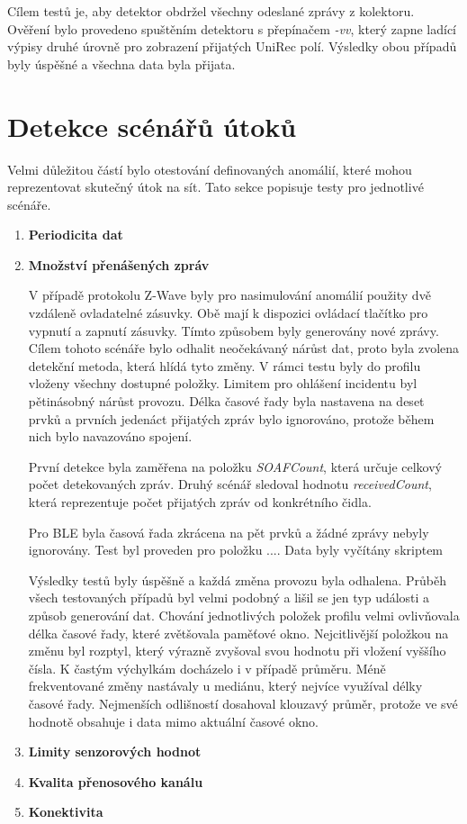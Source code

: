 Cílem testů je, aby detektor obdržel všechny odeslané zprávy z kolektoru. Ověření bylo provedeno
spuštěním detektoru s přepínačem \textit{-vv}, který zapne ladící výpisy druhé úrovně pro zobrazení 
přijatých UniRec polí. Výsledky obou případů byly úspěšné a všechna data byla přijata.

\section{Detekce scénářů útoků}
Velmi důležitou částí bylo otestování definovaných anomálií, které mohou reprezentovat skutečný
útok na sít. Tato sekce popisuje testy pro jednotlivé scénáře.

  \begin{enumerate}
    \item \textbf{Periodicita dat}
    \item \textbf{Množství přenášených zpráv}
    
    V případě protokolu Z-Wave byly pro nasimulování anomálií použity dvě vzdáleně ovladatelné
    zásuvky. Obě mají k dispozici ovládací tlačítko pro vypnutí a zapnutí zásuvky. Tímto způsobem
    byly generovány nové zprávy. Cílem tohoto scénáře bylo odhalit neočekávaný nárůst dat, proto
    byla zvolena detekční metoda, která hlídá tyto změny. V rámci testu byly do profilu 
    vloženy všechny dostupné položky. Limitem pro ohlášení incidentu byl pětinásobný nárůst
    provozu. Délka časové řady byla nastavena na deset prvků a prvních jedenáct přijatých 
    zpráv bylo ignorováno, protože během nich bylo navazováno spojení.
    
    První detekce byla zaměřena na položku \textit{SOAFCount}, která určuje celkový počet 
    detekovaných zpráv.  
    Druhý scénář sledoval hodnotu \textit{receivedCount}, která reprezentuje počet přijatých zpráv od
    konkrétního čidla. 
    
    Pro BLE byla časová řada zkrácena na pět prvků a žádné zprávy nebyly ignorovány.
    Test byl proveden pro položku ....
    Data byly vyčítány skriptem
    
    Výsledky testů byly úspěšně a každá změna provozu byla odhalena. Průběh všech testovaných
    případů byl velmi podobný a lišil se jen typ události a způsob generování dat. Chování 
    jednotlivých položek profilu velmi ovlivňovala délka časové řady, které zvětšovala 
    paměťové okno. Nejcitlivější položkou na změnu byl rozptyl, který výrazně zvyšoval
    svou hodnotu při vložení vyššího čísla. K častým výchylkám docházelo i v případě průměru. 
    Méně frekventované změny nastávaly u mediánu, který nejvíce využíval délky časové řady. 
    Nejmenších odlišností dosahoval klouzavý průměr, protože ve své hodnotě obsahuje i data
    mimo aktuální časové okno.

    \item \textbf{Limity senzorových hodnot}
    \item \textbf{Kvalita přenosového kanálu}
    \item \textbf{Konektivita}
  \end{enumerate}
  

